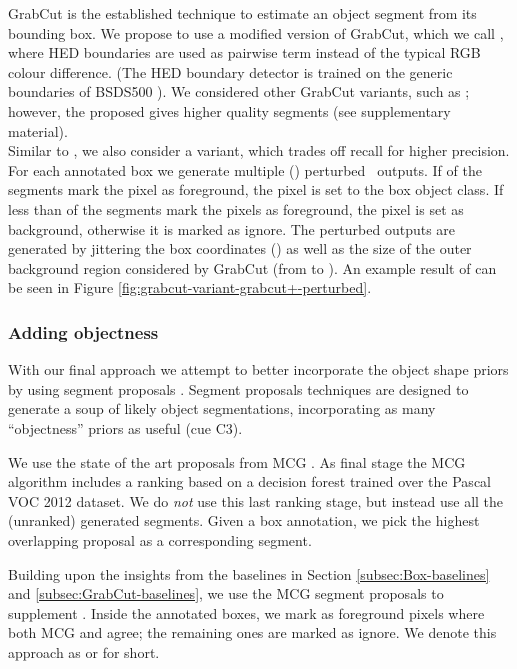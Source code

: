 \documentclass[10pt,english,british,twocolumn]{article}
\begin{document}
GrabCut \cite{Rother2004TogGrabcut} is the established technique
to estimate an object segment from its bounding box. We propose to
use a modified version of GrabCut, which we call ,
where HED boundaries \cite{Xie2015Iccv} are used as pairwise term
instead of the typical RGB colour difference. (The HED boundary detector
is trained on the generic boundaries of BSDS500 \cite{ArbelaezMaireFowlkesMalikPAMI11}).
We considered other GrabCut variants, such as \cite{Cheng2015CgfDenseCut,Tang2015IccvSecretGrabCut};
however, the proposed  gives higher quality segments
(see supplementary material).\\
Similar to , we also consider a 
variant, which trades off recall for higher precision. For each annotated
box we generate multiple () perturbed \texttt{
}outputs. If  of the segments mark the pixel as foreground,
the pixel is set to the box object class. If less than  of
the segments mark the pixels as foreground, the pixel is set as background,
otherwise it is marked as ignore. The perturbed outputs are generated
by jittering the box coordinates () as well as the size of
the outer background region considered by GrabCut (from  to
). An example result of  can be seen
in Figure \ref{fig:grabcut-variant-grabcut+-perturbed}.

\subsubsection{Adding objectness}

With our final approach we attempt to better incorporate the object
shape priors by using segment proposals \cite{PontTuset2015Iccv}.
Segment proposals techniques are designed to generate a soup of likely
object segmentations, incorporating as many ``objectness'' priors
as useful (cue C3). 

We use the state of the art proposals from MCG \cite{PontTuset2015ArxivMcg}.
As final stage the MCG algorithm includes a ranking based on a decision
forest trained over the Pascal VOC 2012 dataset. We do \emph{not}
use this last ranking stage, but instead use all the (unranked) generated
segments. Given a box annotation, we pick the highest overlapping
proposal as a corresponding segment.

Building upon the insights from the baselines in Section \ref{subsec:Box-baselines}
and \ref{subsec:GrabCut-baselines}, we use the MCG segment proposals
to supplement . Inside the annotated boxes, we
mark as foreground pixels where both MCG and 
agree; the remaining ones are marked as ignore. We denote this approach
as  or 
for short.
\end{document}
